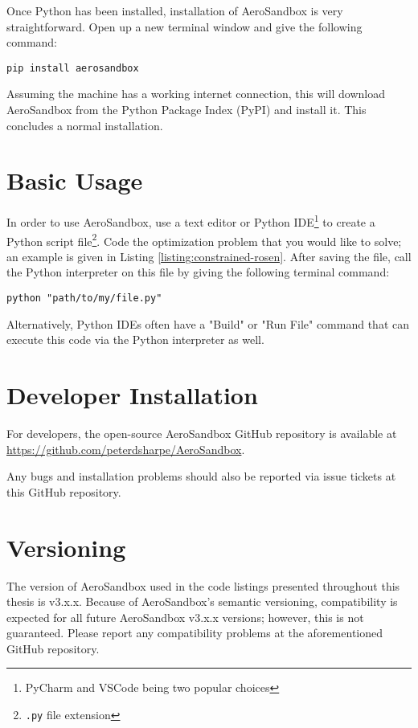 Once Python has been installed, installation of AeroSandbox is very straightforward. Open up a new terminal window and give the following command:
\begin{verbatim}
pip install aerosandbox
\end{verbatim}

Assuming the machine has a working internet connection, this will download AeroSandbox from the Python Package Index (PyPI) and install it. This concludes a normal installation.

\section{Basic Usage}

In order to use AeroSandbox, use a text editor or Python IDE\footnote{PyCharm and VSCode being two popular choices} to create a Python script file\footnote{\texttt{.py} file extension}. Code the optimization problem that you would like to solve; an example is given in Listing \ref{listing:constrained-rosen}. After saving the file, call the Python interpreter on this file by giving the following terminal command:
\begin{verbatim}
python "path/to/my/file.py"
\end{verbatim}

Alternatively, Python IDEs often have a "Build" or "Run File" command that can execute this code via the Python interpreter as well.

\section{Developer Installation}

For developers, the open-source AeroSandbox GitHub repository is available at \url{https://github.com/peterdsharpe/AeroSandbox}.

Any bugs and installation problems should also be reported via issue tickets at this GitHub repository.

\section{Versioning}

The version of AeroSandbox used in the code listings presented throughout this thesis is v3.x.x. %
Because of AeroSandbox's semantic versioning, compatibility is expected for all future AeroSandbox v3.x.x versions; however, this is not guaranteed. Please report any compatibility problems at the aforementioned GitHub repository.